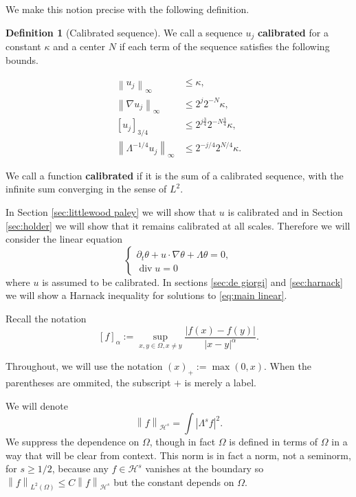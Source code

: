 \documentclass[11pt]{amsart}
\theoremstyle{remark}
\theoremstyle{definition}
\newtheorem{definition}{Definition}
\newcommand{\norm}[1]{\left\lVert#1\right\rVert}
\newcommand{\bracket}[1]{\left[ #1 \right]}
\newcommand{\abs}[1]{\left\lvert #1 \right\rvert}
\newcommand{\del}{\partial}
\newcommand{\grad}{\nabla}
\renewcommand{\div}{\operatorname{div}}
\newcommand{\HD}{\mathcal{H}}
\newcommand{\HDint}[2]{\int \abs{\Lambda^{#1} #2}^2}
\begin{document}
We make this notion precise with the following definition.  

\begin{definition}[Calibrated sequence] \label{def:calibrated}
We call a sequence $u_j$ \textbf{calibrated} for a constant $\kappa$ and a center $N$ if each term of the sequence satisfies the following bounds.  

\begin{align*}
\norm{u_j}_\infty &\leq \kappa, \\
\norm{\grad u_j}_\infty &\leq 2^{j} 2^{-N} \kappa, \\
\bracket{u_j}_{3/4} &\leq 2^{j \frac{3}{4}} 2^{- N \frac{3}{4}} \kappa, \\
\norm{\Lambda^{-1/4} u_j}_\infty &\leq 2^{-j/4} 2^{N/4} \kappa.  
\end{align*} 

We call a function \textbf{calibrated} if it is the sum of a calibrated sequence, with the infinite sum converging in the sense of $L^2$.  

\end{definition}

In Section \ref{sec:littlewood paley} we will show that $u$ is calibrated and in Section \ref{sec:holder} we will show that it remains calibrated at all scales.  Therefore we will consider the linear equation
\begin{equation} \label{eq:main linear} \begin{cases}
\del_t \theta + u \cdot \grad \theta + \Lambda \theta = 0, \\
\div u = 0
\end{cases} \end{equation}
where $u$ is assumed to be calibrated.  In sections \ref{sec:de giorgi} and \ref{sec:harnack} we will show a Harnack inequality for solutions to \eqref{eq:main linear}.  

Recall the notation
\[ \bracket{f}_\alpha := \sup_{x,y \in \Omega, x \neq y} \frac{|f(x)-f(y)|}{|x-y|^\alpha}. \]

Throughout, we will use the notation $(x)_+ := \max(0,x)$.  When the parentheses are ommited, the subscript $+$ is merely a label.  

We will denote
\[ \norm{f}_{\HD^s} = \HDint{s}{f}. \]
We suppress the dependence on $\Omega$, though in fact $\Omega$ is defined in terms of $\Omega$ in a way that will be clear from context.  This norm is in fact a norm, not a seminorm, for $s \geq 1/2$, because any $f \in \HD^s$ vanishes at the boundary so $\norm{f}_{L^2(\Omega)} \leq C \norm{f}_{\HD^s}$ but the constant depends on $\Omega$.  
\end{document}
